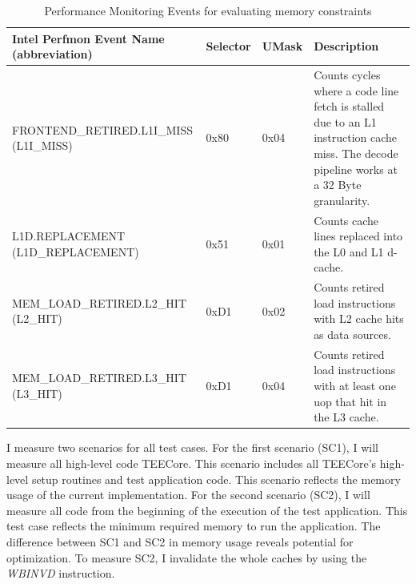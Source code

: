 \begin{table}[ht]
    \centering
    \begin{tabular}{ |p{6cm}|p{1.35cm}|p{1.25cm}|p{4cm}|}
        \hline
        \makecell[l]{Intel Perfmon Event Name                                                                                                 \\ (abbreviation)} & Selector & UMask & Description                                                                      \\
        \hline
        \makecell[l]{FRONTEND\_RETIRED.L1I\_MISS                                                                                              \\ (L1I\_MISS)}       & 0x80     & 0x04  & Counts cycles where a code line fetch is stalled due to an L1 instruction cache miss. The decode pipeline works at a 32 Byte granularity. \\
        \makecell[l]{L1D.REPLACEMENT                                                                                                          \\ (L1D\_REPLACEMENT)} & 0x51 & 0x01 & Counts cache lines replaced into the L0 and L1 d-cache.                          \\
        MEM\_LOAD\_RETIRED.L2\_HIT (L2\_HIT) & 0xD1 & 0x02 & Counts retired load instructions with L2 cache hits as data sources.             \\
        MEM\_LOAD\_RETIRED.L3\_HIT (L3\_HIT) & 0xD1 & 0x04 & Counts retired load instructions with at least one uop that hit in the L3 cache. \\
        \hline
    \end{tabular}
    \caption{Performance Monitoring Events for evaluating memory constraints}
    \label{50:tab:events}
\end{table}

I measure two scenarios for all test cases. For the first scenario (SC1), I will
measure all high-level code TEECore. This scenario includes all TEECore's
high-level setup routines and test application code. This scenario reflects the
memory usage of the current implementation. For the second scenario (SC2), I
will measure all code from the beginning of the execution of the test
application. This test case reflects the minimum required memory to run the
application. The difference between SC1 and SC2 in memory usage reveals
potential for optimization. To measure SC2, I invalidate the whole caches by
using the \textit{WBINVD} instruction. \\

